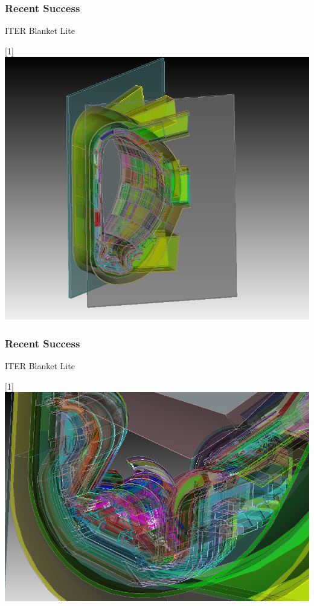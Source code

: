\documentclass[14pt]{beamer}
\begin{document}
\begin{frame}
\frametitle{Recent Success}

ITER Blanket Lite
\begin{center}
\scalebox{-1}[1]{\includegraphics[scale=0.3]{blanketlitemodel.png}}
\end{center}

\end{frame}

\begin{frame}
\frametitle{Recent Success}

ITER Blanket Lite
\begin{center}
\scalebox{-1}[1]{\includegraphics[scale=0.3]{blanketlitemodel_detail.png}}
\end{center}

\end{frame}
\end{document}
